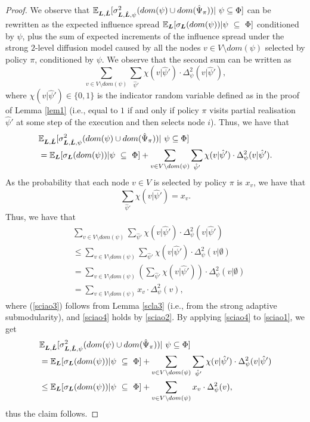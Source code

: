 \begin{proof}
We observe that $\mathbb{E}_{\bm L,\hat{\bm L}}[\sigma^{2}_{\bm L,\hat{\bm L},\psi}(dom(\psi)\cup dom(\hat{\Psi}_{\pi}))|~\psi\subseteq\Phi]$ can be rewritten as the expected influence spread $\mathbb{E}_{\bm L}[\sigma_{\bm L}(dom(\psi))|\psi~\subseteq~\Phi]$ conditioned by $\psi$, plus the sum of expected increments of the influence spread under the strong $2$-level diffusion model caused by all the nodes $v\in V\setminus dom(\psi)$ selected by policy $\pi$, conditioned by $\psi$. We observe that the second sum can be written as $$\sum_{v\in V\setminus dom(\psi)}\sum_{\hat{\psi}'}\chi(v|\hat{\psi}')\cdot \Delta^2_\psi(v|\hat{\psi}'),$$ 
where $\chi(v|\hat{\psi}')\in \{0,1\}$ is the indicator random variable defined as in the proof of Lemma \ref{lem1} (i.e., equal to $1$ if and only if policy $\pi$ visits partial realisation $\hat{\psi}'$ at some step of the execution and then selects node $i$). 
Thus, we have that
\begin{align}
&\mathbb{E}_{\bm L,\hat{\bm L}}[\sigma^{2}_{\bm L,\hat{\bm L},\psi}(dom(\psi)\cup dom(\hat{\Psi}_{\pi}))|~\psi\subseteq\Phi]\nonumber\\
&=\mathbb{E}_{\bm L}[\sigma_{\bm L}(dom(\psi))|\psi~\subseteq~\Phi]+\sum_{v\in V\setminus dom(\psi)}\sum_{\hat{\psi}'}\chi(v|\hat{\psi}')\cdot \Delta^2_\psi(v|\hat{\psi}').\label{sciao1}
\end{align}
As the probability that each node $v\in V$ is selected by policy $\pi$ is $x_v$, we have that 
\begin{equation}\label{sciao2}
\sum_{\hat{\psi}'}\chi(v|\hat{\psi}')=x_v.
\end{equation}
Thus, we have that
\begin{align}
&\sum_{v\in V\setminus dom(\psi)}\sum_{\hat{\psi}'}\chi(v|\hat{\psi}')\cdot \Delta^2_\psi(v|\hat{\psi}')\nonumber\\
&\leq \sum_{v\in V\setminus dom(\psi)}\sum_{\hat{\psi}'}\chi(v|\hat{\psi}')\cdot \Delta^2_\psi(v|\emptyset)\label{sciao3}\\
&= \sum_{v\in V\setminus dom(\psi)}\left(\sum_{\hat{\psi}'}\chi(v|\hat{\psi}')\right)\cdot \Delta^2_\psi(v|\emptyset)\nonumber\\
&=\sum_{v\in V\setminus dom(\psi)}x_v\cdot \Delta^2_\psi(v),\label{sciao4}
\end{align}
where (\ref{sciao3}) follows from Lemma \ref{scla3} (i.e., from the strong adaptive submodularity), and \eqref{sciao4} holds by \eqref{sciao2}.
By applying \eqref{sciao4} to \eqref{sciao1}, we get
\begin{align*}
&\mathbb{E}_{\bm L,\hat{\bm L}}[\sigma^{2}_{\bm L,\hat{\bm L},\psi}(dom(\psi)\cup dom(\hat{\Psi}_{\pi}))|~\psi\subseteq\Phi]\nonumber\\
&=\mathbb{E}_{\bm L}[\sigma_{\bm L}(dom(\psi))|\psi~\subseteq~\Phi]+\sum_{v\in V\setminus dom(\psi)}\sum_{\hat{\psi}'}\chi(v|\hat{\psi}')\cdot \Delta^2_\psi(v|\hat{\psi}')\\
&\leq \mathbb{E}_{\bm L}[\sigma_{\bm L}(dom(\psi))|\psi~\subseteq~\Phi]+\sum_{v\in V\setminus dom(\psi)}x_v\cdot \Delta^2_\psi(v),
\end{align*}
thus the claim follows. 
\end{proof}

